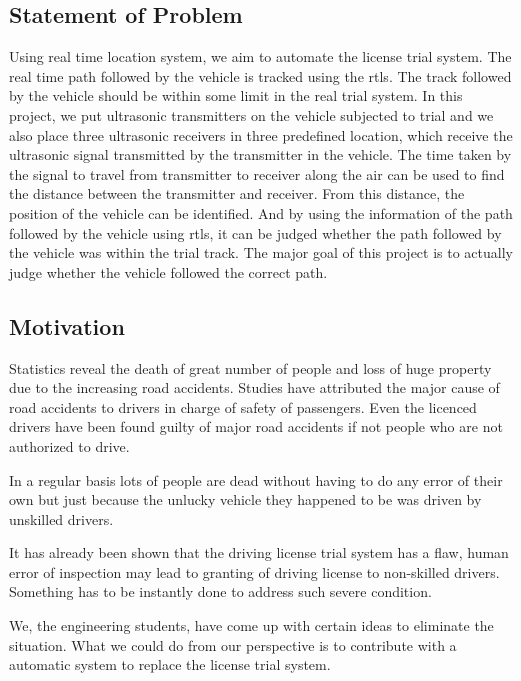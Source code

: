 \subsection{Statement of Problem}
Using real time location system, we aim to automate the license trial system. The real time path followed by the vehicle is tracked using the \gls{rtls}. The track followed by the vehicle should be within some limit in the real trial system. In this project, we put ultrasonic transmitters on the vehicle subjected to trial and we also place three ultrasonic receivers in three predefined location, which receive the ultrasonic signal transmitted by the transmitter in the vehicle. The time taken by the signal to travel from transmitter to receiver along the air can be used to find the distance between the transmitter and receiver. From this distance, the position of the vehicle can be identified. And by using the information of the path followed by the vehicle using \gls{rtls}, it can be judged whether the path followed by the vehicle was within the trial track. The major goal of this project is to actually judge whether the vehicle followed the correct path. 


\subsection{Motivation}
Statistics reveal the death of great number of people and loss of huge property due to the increasing road accidents. Studies have attributed the major cause of road accidents to drivers in charge of safety of passengers. Even the licenced drivers have been found guilty of major road accidents if not people who are not authorized to drive. 


In a regular basis lots of people are dead without having to do any error of their own but just because the unlucky vehicle they happened to be was driven by unskilled drivers.


It has already been shown that the driving license trial system has a flaw, human error of inspection may lead to granting of driving license to non-skilled drivers. Something has to be instantly done to address such severe condition. 


We, the engineering students, have come up with certain ideas to eliminate the situation. What we could do from our perspective is to contribute with a automatic system to replace the license trial system. 

